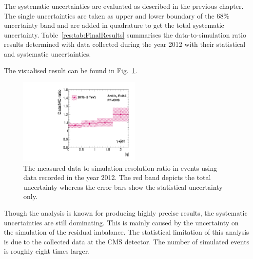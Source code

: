 The systematic uncertainties are evaluated as described in the previous chapter. 
The single uncertainties are taken as upper and lower boundary of the 68\% uncertainty band and are added in quadrature to get the total systematic uncertainty.
Table~\ref{res:tab:FinalResults} summarises the data-to-simulation ratio results determined with data collected during the year 2012 with their statistical and systematic uncertainties.
\renewcommand{\arraystretch}{1.5}
\begin{table}[t]
\centering
\caption{Data-to-simulation resolution scale factors \rhores with statistical and systematic uncertainties.}
\label{res:tab:FinalResults}
\large{
}
\end{table}  
The visualised result can be found in Fig.~\ref{res:fig:RatioFinal}.
\begin{figure}[!t]
 \centering
    \includegraphics[width=0.54\textwidth]{figures/resolution/results/MySingleFinalResult.pdf}
  \caption{The measured data-to-simulation resolution ratio in \GAMJET events using data recorded in the year 2012.
           The red band depicts the total uncertainty whereas the error bars show the statistical uncertainty only.}
  \label{res:fig:RatioFinal}
\end{figure}

Though the \GAMJET analysis is known for producing highly precise results, the systematic uncertainties are still dominating. 
This is mainly caused by the uncertainty on the simulation of the residual imbalance.
The statistical limitation of this analysis is due to the collected data at the CMS detector.
The number of simulated events is roughly eight times larger.

